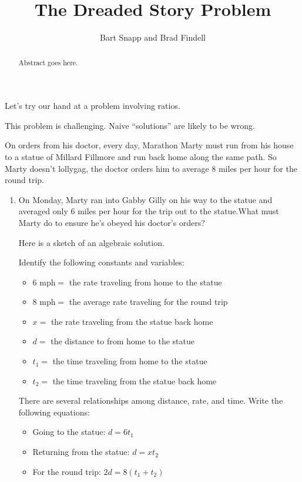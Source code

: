 \documentclass{ximera}
\title{The Dreaded Story Problem}
\author{Bart Snapp and Brad Findell}
\begin{document}
\begin{abstract}
Abstract goes here.  
\end{abstract}
\maketitle

\label{A:dreadedStoryProblem}

Let's try our hand at a problem involving ratios.

\begin{teachingnote}
This problem is challenging.  Naive ``solutions'' are likely to be wrong.  
\end{teachingnote}


\begin{problem}
On orders from his doctor, every day, Marathon Marty must run from his
house to a statue of Millard Fillmore and run back home along the same
path.  So Marty doesn't lollygag, the doctor orders him to average 8
miles per hour for the round trip.  
\begin{enumerate}
\item On Monday, Marty ran into Gabby Gilly on his way
to the statue and averaged only 6 miles per hour for the trip out to
the statue.What must Marty do to ensure he's obeyed his doctor's orders? 


\begin{teachingnote}
Here is a sketch of an algebraic solution.  

Identify the following constants and variables:  
\begin{itemize}
\item $6 \text{ mph} =$ the rate traveling from home to the statue
\item $8 \text{ mph} =$ the average rate traveling for the round trip
\item $x = $ the rate traveling from the statue back home
\item $d =$ the distance to from home to the statue
\item $t_1 = $ the time traveling from home to the statue
\item $t_2 = $ the time traveling from the statue back home
\end{itemize}

\vspace{0.15in}

There are several relationships among distance, rate, and time.  Write the following equations: 
\begin{itemize}
\item Going to the statue:  $d = 6t_1$
\item Returning from the statue:  $d = xt_2$
\item For the round trip:  $2d = 8(t_1+t_2)$
\end{itemize}


\end{teachingnote}
\end{enumerate}
\end{problem}
\end{document}
